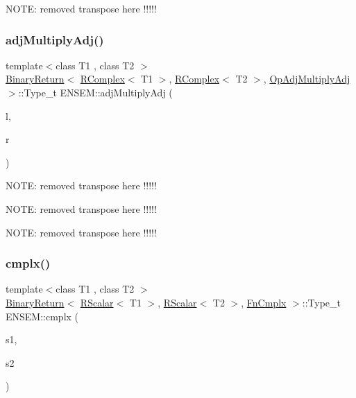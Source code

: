 N\+O\+TE\+: removed transpose here !!!!! \mbox{\label{group__rcomplex_gac9d1c7be9449dc3fbb0a17d63a51dc17}} 
\subsubsection{\texorpdfstring{adjMultiplyAdj()}{adjMultiplyAdj()}}
{\footnotesize\ttfamily template$<$class T1 , class T2 $>$ \\
\mbox{\hyperlink{structENSEM_1_1BinaryReturn}{Binary\+Return}}$<$ \mbox{\hyperlink{classENSEM_1_1RComplex}{R\+Complex}}$<$ T1 $>$, \mbox{\hyperlink{classENSEM_1_1RComplex}{R\+Complex}}$<$ T2 $>$, \mbox{\hyperlink{structENSEM_1_1OpAdjMultiplyAdj}{Op\+Adj\+Multiply\+Adj}} $>$\+::Type\+\_\+t E\+N\+S\+E\+M\+::adj\+Multiply\+Adj (\begin{DoxyParamCaption}\item[{const \mbox{\hyperlink{classENSEM_1_1RComplex}{R\+Complex}}$<$ T1 $>$ \&}]{l,  }\item[{const \mbox{\hyperlink{classENSEM_1_1RComplex}{R\+Complex}}$<$ T2 $>$ \&}]{r }\end{DoxyParamCaption})\hspace{0.3cm}{\ttfamily [inline]}}

N\+O\+TE\+: removed transpose here !!!!!

N\+O\+TE\+: removed transpose here !!!!!

N\+O\+TE\+: removed transpose here !!!!! \mbox{\label{group__rcomplex_gae6f982df6dd1eba378ad74676dc96bba}} 
\subsubsection{\texorpdfstring{cmplx()}{cmplx()}}
{\footnotesize\ttfamily template$<$class T1 , class T2 $>$ \\
\mbox{\hyperlink{structENSEM_1_1BinaryReturn}{Binary\+Return}}$<$ \mbox{\hyperlink{classENSEM_1_1RScalar}{R\+Scalar}}$<$ T1 $>$, \mbox{\hyperlink{classENSEM_1_1RScalar}{R\+Scalar}}$<$ T2 $>$, \mbox{\hyperlink{structENSEM_1_1FnCmplx}{Fn\+Cmplx}} $>$\+::Type\+\_\+t E\+N\+S\+E\+M\+::cmplx (\begin{DoxyParamCaption}\item[{const \mbox{\hyperlink{classENSEM_1_1RScalar}{R\+Scalar}}$<$ T1 $>$ \&}]{s1,  }\item[{const \mbox{\hyperlink{classENSEM_1_1RScalar}{R\+Scalar}}$<$ T2 $>$ \&}]{s2 }\end{DoxyParamCaption})\hspace{0.3cm}{\ttfamily [inline]}}

